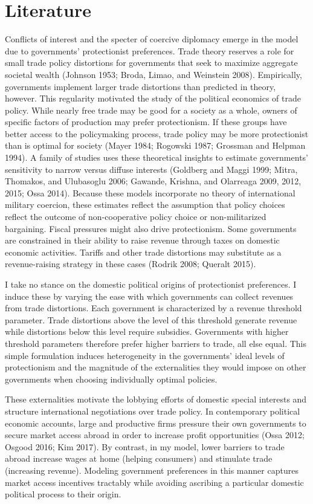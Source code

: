 \documentclass{puthesis}
\begin{document}
\section{Literature}

Conflicts of interest and the specter of coercive diplomacy emerge in
the model due to governments' protectionist preferences. Trade theory
reserves a role for small trade policy distortions for governments that
seek to maximize aggregate societal wealth (Johnson 1953; Broda, Limao,
and Weinstein 2008). Empirically, governments implement larger trade
distortions than predicted in theory, however. This regularity motivated
the study of the political economics of trade policy. While nearly free
trade may be good for a society as a whole, owners of specific factors
of production may prefer protectionism. If these groups have better
access to the policymaking process, trade policy may be more
protectionist than is optimal for society (Mayer 1984; Rogowski 1987;
Grossman and Helpman 1994). A family of studies uses these theoretical
insights to estimate governments' sensitivity to narrow versus diffuse
interests (Goldberg and Maggi 1999; Mitra, Thomakos, and Ulubasoglu
2006; Gawande, Krishna, and Olarreaga 2009, 2012, 2015; Ossa 2014).
Because these models incorporate no theory of international military
coercion, these estimates reflect the assumption that policy choices
reflect the outcome of non-cooperative policy choice or non-militarized
bargaining. Fiscal pressures might also drive protectionism. Some
governments are constrained in their ability to raise revenue through
taxes on domestic economic activities. Tariffs and other trade
distortions may substitute as a revenue-raising strategy in these cases
(Rodrik 2008; Queralt 2015).

I take no stance on the domestic political origins of protectionist
preferences. I induce these by varying the ease with which governments
can collect revenues from trade distortions. Each government is
characterized by a revenue threshold parameter. Trade distortions above
the level of this threshold generate revenue while distortions below
this level require subsidies. Governments with higher threshold
parameters therefore prefer higher barriers to trade, all else equal.
This simple formulation induces heterogeneity in the governments' ideal
levels of protectionism and the magnitude of the externalities they
would impose on other governments when choosing individually optimal
policies.

These externalities motivate the lobbying efforts of domestic special
interests and structure international negotiations over trade policy. In
contemporary political economic accounts, large and productive firms
pressure their own governments to secure market access abroad in order
to increase profit opportunities (Ossa 2012; Osgood 2016; Kim 2017). By
contrast, in my model, lower barriers to trade abroad increase wages at
home (helping consumers) and stimulate trade (increasing revenue).
Modeling government preferences in this manner captures market access
incentives tractably while avoiding ascribing a particular domestic
political process to their origin.
\end{document}
